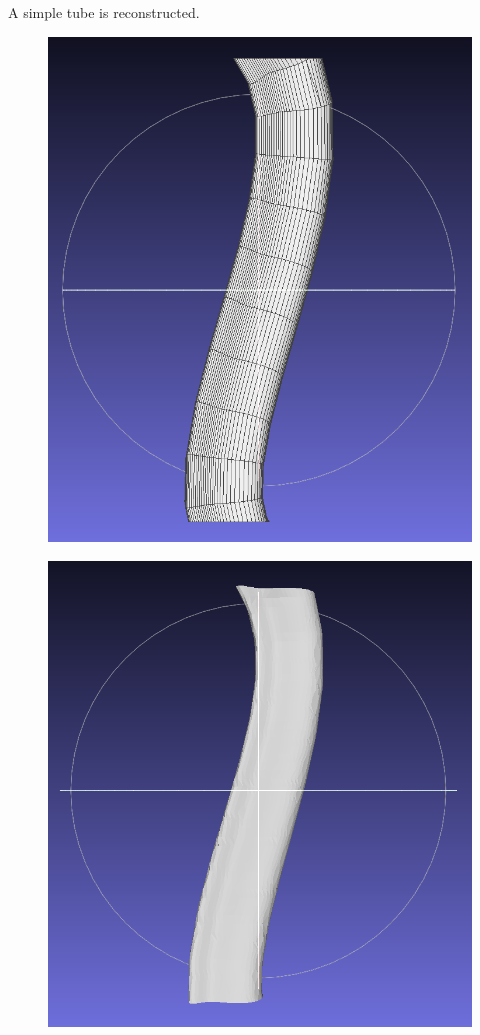 \documentclass[11p, titlepage]{article}
\begin{document}
A simple tube is reconstructed.

\begin{figure}[h]
     \centering
     \begin{minipage}[b]{.38\linewidth}
       {\includegraphics[width=\linewidth]{originals/simple}}%
     \end{minipage}%
     \hfill
     \begin{minipage}[b]{.6\linewidth}
       {\includegraphics[width=.48\linewidth]{reconstructions/dtw-simple-50}}%

\end{minipage}
\end{figure}
\end{document}
